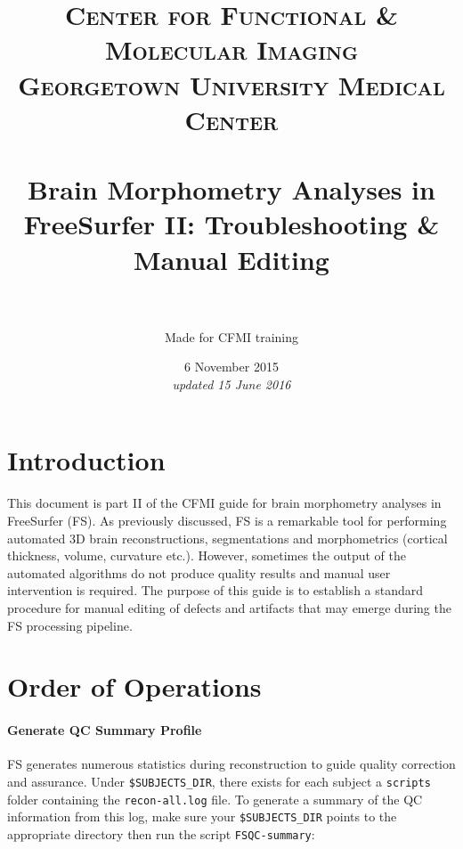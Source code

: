 \documentclass[paper=a4, fontsize=11pt]{scrartcl} %
\title{	
\normalfont \normalsize 
\textsc{Center for Functional \& Molecular Imaging \\ Georgetown University Medical Center} \\ [25pt] %
\horrule{0.5pt} \\[0.4cm] %
\huge Brain Morphometry Analyses in FreeSurfer II:  Troubleshooting \& Manual Editing  \\ %
\horrule{2pt} \\[0.5cm] %
}
\author{Made for CFMI training} %
\date{\normalsize 6 November 2015\\ \textit{updated 15 June 2016}} %
\numberwithin{equation}{section} %
\numberwithin{figure}{section} %
\numberwithin{table}{section} %
\begin{document}
\maketitle %




\section{Introduction}  This document is part II of the CFMI guide for brain morphometry analyses in FreeSurfer (FS).  As previously discussed, FS is a remarkable tool for performing automated 3D brain  reconstructions, segmentations and morphometrics (cortical thickness, volume, curvature etc.).  However, sometimes the output of the automated algorithms do not produce quality results and manual user intervention is required.  The purpose of this guide is to establish a standard procedure for manual editing of defects and artifacts that may emerge during the FS processing pipeline.


\section{Order of Operations} 
\paragraph{Generate QC Summary Profile} FS generates numerous statistics during reconstruction to guide quality correction and assurance. Under \texttt{\$SUBJECTS\_DIR}, there exists for each subject a \texttt{scripts} folder containing the \texttt{recon-all.log} file.  To generate a summary of the QC information from this log, make sure your \texttt{\$SUBJECTS\_DIR} points to the appropriate directory then run the script \texttt{FSQC-summary}:
\end{document}
